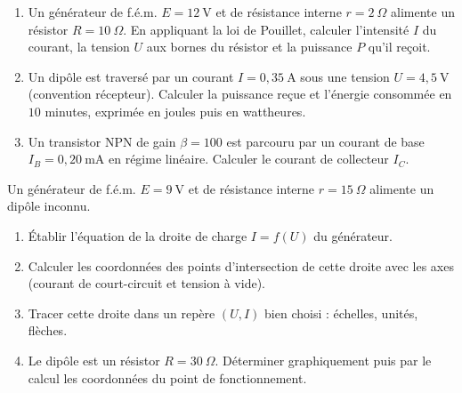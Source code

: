 \documentclass[11pt]{article}
\newcounter{popsec}
\newcounter{popsub}
\newcommand{\courssub}[1]{%
  \stepcounter{popsub}%
  \par\vspace{9pt}\noindent{\popxbold\fontsize{11.5}{13}\selectfont\color{popink}{\color{poporange}\thepopsec.\thepopsub}\hspace{6pt}#1}\par\nopagebreak\vspace{4pt}
}
\begin{document}
\begin{exercice}
\begin{enumerate}
\item Un générateur de f.é.m. $E = 12~\text{V}$ et de résistance interne $r = 2~\Omega$ alimente un résistor $R = 10~\Omega$. En appliquant la loi de Pouillet, calculer l'intensité $I$ du courant, la tension $U$ aux bornes du résistor et la puissance $P$ qu'il reçoit.
\item Un dipôle est traversé par un courant $I = 0{,}35~\text{A}$ sous une tension $U = 4{,}5~\text{V}$ (convention récepteur). Calculer la puissance reçue et l'énergie consommée en $10$ minutes, exprimée en joules puis en wattheures.
\item Un transistor NPN de gain $\beta = 100$ est parcouru par un courant de base $I_B = 0{,}20~\text{mA}$ en régime linéaire. Calculer le courant de collecteur $I_C$.
\end{enumerate}
\end{exercice}

\courssub{Je m'entraîne}

\begin{exercice}
Un générateur de f.é.m. $E = 9~\text{V}$ et de résistance interne $r = 15~\Omega$ alimente un dipôle inconnu.
\begin{enumerate}
\item Établir l'équation de la droite de charge $I = f(U)$ du générateur.
\item Calculer les coordonnées des points d'intersection de cette droite avec les axes (courant de court-circuit et tension à vide).
\item Tracer cette droite dans un repère $(U, I)$ bien choisi : échelles, unités, flèches.
\item Le dipôle est un résistor $R = 30~\Omega$. Déterminer graphiquement puis par le calcul les coordonnées du point de fonctionnement.
\end{enumerate}
\end{exercice}
\end{document}
